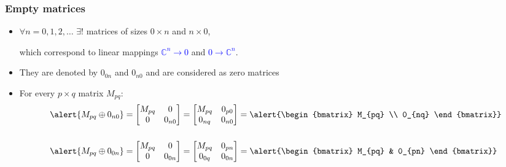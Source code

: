 \documentclass[usenames,dvipsnames]{beamer}
\begin{document}
\begin{frame}
\frametitle{Empty matrices}

\begin{itemize}
  \item $\forall n=0,1,2,\dots$
      $\exists !$ matrices of sizes
      \alert{$0\times n$} and
      \alert{$n\times 0$},

      which correspond to linear
  mappings
  \textcolor{blue}{$\mathbb C^n\to
  0$} and
  \textcolor{blue}{$0\to\mathbb
      C^n$}.
\medskip

  \item They are denoted by
      \alert{$0_{0n}$} and
      \alert{$0_{n0}$} and are
      considered as zero matrices
\medskip

  \item For every $p\times q$
      matrix $M_{pq}$:
\begin{align*}
\alert{M_{pq}\oplus 0_{n0}}&=\begin{bmatrix}
  M_{pq} & 0 \\
  0 &0_{n0}
\end{bmatrix}=\begin{bmatrix}
  M_{pq}& 0_{p0} \\
  0_{nq}& 0_{n0}
\end{bmatrix}=\alert{\begin{bmatrix}
M_{pq} \\ 0_{nq}
\end{bmatrix}}
\\[5mm]
\alert{M_{pq}\oplus 0_{0n}}&=\begin{bmatrix}
  M_{pq} & 0 \\
  0 & 0_{0n}
\end{bmatrix}=\begin{bmatrix}
  M_{pq}& 0_{pn} \\
  0_{0q}& 0_{0n}
\end{bmatrix}=\alert{\begin{bmatrix}
   M_{pq} & 0_{pn}
\end{bmatrix}}
\end{align*}

\end{itemize}
  \end{frame}
\end{document}
